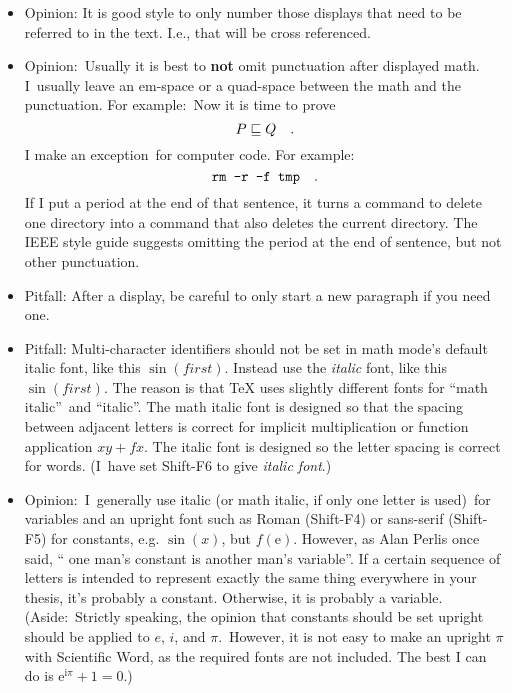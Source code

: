 \begin{itemize}
\item Opinion: It is good style to only number those displays that need to
be referred to in the text. I.e., that will be cross referenced.

\item Opinion:\ Usually it is best to \textbf{not} omit punctuation after
displayed math. I\ usually leave an em-space or a quad-space between the
math and the punctuation. For example:\ Now it is time to prove%
\begin{equation*}
P\sqsubseteq Q\text{\quad .}
\end{equation*}%
I make an exception\ for computer code. For example:\ 
\begin{equation*}
\text{\texttt{rm -r -f tmp}\quad .}
\end{equation*}%
If I put a period at the end of that sentence, it turns a command to delete
one directory into a command that also deletes the current directory. The
IEEE style guide suggests omitting the period at the end of sentence, but
not other punctuation.

\item Pitfall: After a display, be careful to only start a new paragraph if
you need one.

\item Pitfall: Multi-character identifiers should not be set in math mode's
default italic font, like this $\sin (first)$. Instead use the \textit{italic%
} font, like this $\sin (\mathit{first})$. The reason is that TeX uses
slightly different fonts for \textquotedblleft math
italic\textquotedblright\ and \textquotedblleft italic\textquotedblright .
The math italic font is designed so that the spacing between adjacent
letters is correct for implicit multiplication or function application $%
xy+fx $. The italic font is designed so the letter spacing is correct for
words. (I\ have set Shift-F6 to give \textit{italic font}.)

\item Opinion:\ I\ generally use italic (or math italic, if only one letter
is used)\ for variables and \textrm{an upright font such as Roman}
(Shift-F4) or \textsf{sans-serif} (Shift-F5) for constants, e.g. $\sin (x)$,
but $f(\mathrm{e})$. However, as Alan Perlis once said, \textquotedblleft
one man's constant is another man's variable\textquotedblright . If a
certain sequence of letters is intended to represent exactly the same thing
everywhere in your thesis, it's probably a constant. Otherwise, it is
probably a variable. (Aside:\ Strictly speaking, the opinion that constants
should be set upright should be applied to $e$, $i$, and $\pi $.\ However,
it is not easy to make an upright $\pi $ with Scientific Word, as the
required fonts are not included. The best I can do is $\mathrm{e}^{\mathrm{i}%
\pi }+1=0$.)


\end{itemize}
